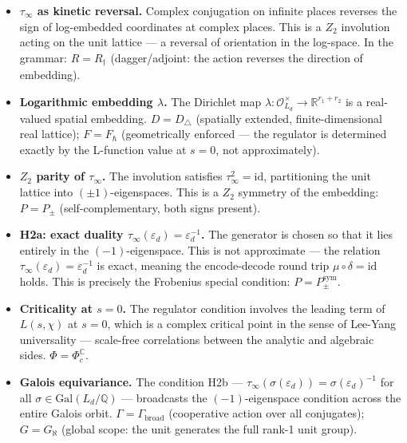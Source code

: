 \documentclass[12pt]{article}
\theoremstyle{plain}
\theoremstyle{definition}
\theoremstyle{remark}
\newcommand{\OO}{\mathcal{O}}
\newcommand{\bQ}{\mathbb{Q}}
\newcommand{\bR}{\mathbb{R}}
\newcommand{\tauinf}{\tau_\infty}
\newcommand{\epsd}{\varepsilon_d}
\begin{document}
\begin{itemize}
  \item \textbf{$\tauinf$ as kinetic reversal.} Complex conjugation on infinite places reverses
    the sign of log-embedded coordinates at complex places. This is a $Z_2$ involution acting
    on the unit lattice — a reversal of orientation in the log-space. In the grammar:
    $R = R_\dagger$ (dagger/adjoint: the action reverses the direction of embedding).

  \item \textbf{Logarithmic embedding $\lambda$.} The Dirichlet map $\lambda: \OO_{L_d}^\times
    \to \bR^{r_1 + r_2}$ is a real-valued spatial embedding. $D = D_\triangle$ (spatially
    extended, finite-dimensional real lattice); $F = F_\hbar$ (geometrically enforced — the
    regulator is determined exactly by the L-function value at $s = 0$, not approximately).

  \item \textbf{$Z_2$ parity of $\tauinf$.} The involution satisfies $\tauinf^2 = \mathrm{id}$,
    partitioning the unit lattice into $(\pm 1)$-eigenspaces. This is a $Z_2$ symmetry of the
    embedding: $P = P_{\pm}$ (self-complementary, both signs present).

  \item \textbf{H2a: exact duality $\tauinf(\epsd) = \epsd^{-1}$.} The generator is chosen so
    that it lies entirely in the $(-1)$-eigenspace. This is not approximate — the relation
    $\tauinf(\epsd) = \epsd^{-1}$ is exact, meaning the encode-decode round trip $\mu \circ
    \delta = \mathrm{id}$ holds. This is precisely the Frobenius special condition:
    $P = P_{\pm}^{\text{sym}}$.

  \item \textbf{Criticality at $s = 0$.} The regulator condition involves the leading term of
    $L(s, \chi)$ at $s = 0$, which is a complex critical point in the sense of Lee-Yang
    universality — scale-free correlations between the analytic and algebraic sides.
    $\Phi = \Phi_c^\mathbb{C}$.

  \item \textbf{Galois equivariance.} The condition H2b — $\tauinf(\sigma(\epsd)) =
    \sigma(\epsd)^{-1}$ for all $\sigma \in \mathrm{Gal}(L_d/\bQ)$ — broadcasts the
    $(-1)$-eigenspace condition across the entire Galois orbit. $\Gamma = \Gamma_\text{broad}$
    (cooperative action over all conjugates); $G = G_\aleph$ (global scope: the unit generates
    the full rank-1 unit group).


\end{itemize}
\end{document}
